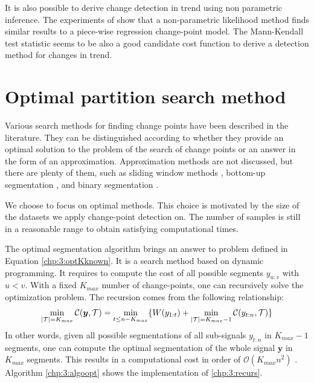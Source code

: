 It is also possible to derive change detection in trend using non parametric inference. The experiments of \cite{Haynes2016} show that a non-parametric likelihood method finds similar results to a piece-wise regression change-point model. The Mann-Kendall test statistic \citep{Pohlert2020,1994a} seems to be also a good candidate cost function to derive a detection method for changes in trend.  


\section{Optimal partition search method}\label{chp:3:2}

Various search methods for finding change points have been described in the literature. They can be distinguished according to whether they provide an optimal solution to the problem of the search of change points or an answer in the form of an approximation. Approximation methods are not discussed, but there are plenty of them, such as sliding window methods \citep{Li2010,Liu2022}, bottom-up segmentation \citep{chen1998speaker}, and binary segmentation \citep{Yang2001,Fryzlewicz2014}. 

We choose to focus on optimal methods. This choice is motivated by the size of the datasets we apply change-point detection on. The number of samples is still in a reasonable range to obtain satisfying computational times.  

The optimal segmentation algorithm brings an answer to problem defined in Equation \eqref{chp:3:optKknown}. It is a search method based on dynamic programming. It requires to compute the cost of all possible segments $y_{u:v}$ with $u<v$.  With a fixed $K_{max}$ number of change-points, one can recursively solve the optimization problem. The recursion comes from the following relationship: 
\begin{equation}\label{chp:3:recurs}
\min_{\lvert{\mathcal T}\rvert = K_{max}}\mathcal{C}(\bm y, {\mathcal T}) = \min_{t \leq n-K_{max}}\{W(y_{1:t})+\min_{\lvert{\mathcal T}\rvert = K_{max}-1}\mathcal{C}(y_{t:n},{\mathcal T})\} 
\end{equation}
In other words, given all possible segmentations of all sub-signals $y_{t:n}$ in $K_{max}-1$ segments, one can compute the optimal segmentation of the whole signal $\bm y$ in $K_{max}$ segments. This results in a computational cost in order of $\mathcal{O}(K_{max}n^2)$ \citep{haynes2017}. Algorithm \ref{chp:3:algoopt} shows the implementation of \eqref{chp:3:recurs}. 

